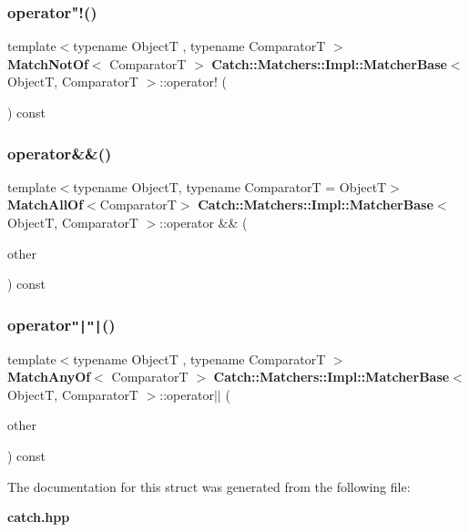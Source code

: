 \subsubsection{operator"!()}
{\footnotesize\ttfamily template$<$typename ObjectT , typename ComparatorT $>$ \\
\textbf{ Match\+Not\+Of}$<$ ComparatorT $>$ \textbf{ Catch\+::\+Matchers\+::\+Impl\+::\+Matcher\+Base}$<$ ObjectT, ComparatorT $>$\+::operator! (\begin{DoxyParamCaption}{ }\end{DoxyParamCaption}) const}

\mbox{\label{struct_catch_1_1_matchers_1_1_impl_1_1_matcher_base_a3deede6b29d20c15cb5efc79df40a520}} 
\subsubsection{operator\&\&()}
{\footnotesize\ttfamily template$<$typename ObjectT, typename ComparatorT = ObjectT$>$ \\
\textbf{ Match\+All\+Of}$<$ComparatorT$>$ \textbf{ Catch\+::\+Matchers\+::\+Impl\+::\+Matcher\+Base}$<$ ObjectT, ComparatorT $>$\+::operator \&\& (\begin{DoxyParamCaption}\item[{\textbf{ Matcher\+Base}$<$ ObjectT, ComparatorT $>$ const \&}]{other }\end{DoxyParamCaption}) const}

\mbox{\label{struct_catch_1_1_matchers_1_1_impl_1_1_matcher_base_ae0345ee76d109ac6d0241be261450ebc}} 
\subsubsection{operator\texttt{"|}\texttt{"|}()}
{\footnotesize\ttfamily template$<$typename ObjectT , typename ComparatorT $>$ \\
\textbf{ Match\+Any\+Of}$<$ ComparatorT $>$ \textbf{ Catch\+::\+Matchers\+::\+Impl\+::\+Matcher\+Base}$<$ ObjectT, ComparatorT $>$\+::operator$\vert$$\vert$ (\begin{DoxyParamCaption}\item[{\textbf{ Matcher\+Base}$<$ ObjectT, ComparatorT $>$ const \&}]{other }\end{DoxyParamCaption}) const}



The documentation for this struct was generated from the following file\+:\begin{DoxyCompactItemize}
\item 
\textbf{ catch.\+hpp}\end{DoxyCompactItemize}
